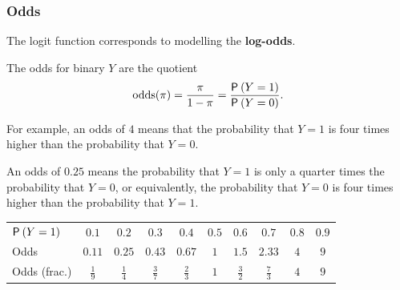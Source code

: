 \documentclass{beamer}
\begin{document}
\begin{frame}[fragile]
\frametitle{Odds}
\bi
\item The logit function corresponds to modelling the \textbf{log-odds}.

\item The odds for binary $Y$ are the quotient 
\begin{align*}
 \mathrm{odds}(\pi) = \frac{\pi}{1-\pi} = \frac{\P{Y=1}}{\P{Y=0}}.
\end{align*}

\item For example, an odds of $4$ means that the probability that $Y=1$ is four times higher than the probability that $Y=0$. 
\item An odds of $0.25$ means the probability that $Y=1$ is only a quarter times the probability that $Y=0$, or equivalently, the probability that $Y=0$ is four times higher than the probability that $Y=1$.
\ei

\begin{tabular}{lccccccccc}
\toprule
 $\P{Y=1}$& $0.1$ & $0.2$ & $0.3$ & $0.4$ & $0.5$ & $0.6$& $0.7$ & $ 0.8$& $0.9$\\
 Odds & $0.11$ & $0.25$ & $0.43$ & $0.67$ & $1$ &$1.5$ & $2.33$ & $4$ & $9$\\
 Odds (frac.) & $\frac{1}{9}$ & $\frac{1}{4}$
 & $\frac{3}{7}$ & $\frac{2}{3}$ & $1$ & $\frac{3}{2}$ & $\frac{7}{3}$ & $4$ & $9$\\
 \bottomrule
 
\end{tabular}


\end{frame}
\end{document}
